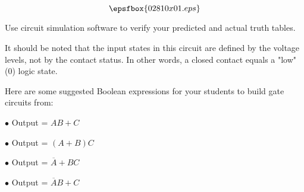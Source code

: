 

$$\epsfbox{02810x01.eps}$$

\vfil \eject






Use circuit simulation software to verify your predicted and actual truth tables.







It should be noted that the input states in this circuit are defined by the voltage levels, not by the contact status.  In other words, a closed contact equals a "low" (0) logic state.

Here are some suggested Boolean expressions for your students to build gate circuits from:

\medskip
\goodbreak
\item{$\bullet$} Output = $AB + C$
\item{$\bullet$} Output = $(A + B)C$
\item{$\bullet$} Output = $\overline{A} + BC$
\item{$\bullet$} Output = $\overline{A}B + C$
\medskip




